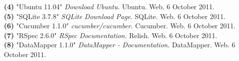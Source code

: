 \documentclass{article}
\begin{document}
\noindent\hangindent=1.4cm
\textbf{(4)} "Ubuntu 11.04" 
\emph{Download Ubuntu.} Ubuntu. Web.  6 October 2011.\\

\noindent\hangindent=1.4cm
\textbf{(5)} "SQLite 3.7.8" 
\emph{SQLite Download Page.} SQLite. Web.  6 October 2011.\\

\noindent\hangindent=1.4cm
\textbf{(6)} "Cucumber 1.1.0" 
\emph{cucumber/cucumber.} Cucumber. Web.  6 October 2011.\\

\noindent\hangindent=1.4cm
\textbf{(7)} "RSpec 2.6.0" 
\emph{RSpec Documentation.} Relish. Web.  6 October 2011.\\

\noindent\hangindent=1.4cm
\textbf{(8)} "DataMapper 1.1.0" 
\emph{DataMapper - Documentation.} DataMapper. Web.  6 October 2011.\\
\end{document}

